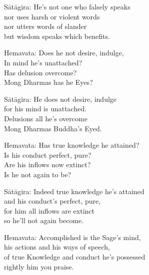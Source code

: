 \begin{MyDescription}{S\=at\=agira:}
He's not one who falsely speaks\\
nor uses harsh or violent words\\
nor utters words of slander\\
but wisdom speaks which benefits.
\end{MyDescription}   

\begin{MyDescription}{Hemavata:}
Does he not desire, indulge,\\
In mind he's unattached?\\
Has delusion overcome?\\
Mong Dharmas has he Eyes?
\end{MyDescription}   

\begin{MyDescription}{S\=at\=agira:}
He does not desire, indulge\\
for his mind is unattached.\\
Delusions all he's overcome\\
Mong Dharmas Buddha's Eyed.
\end{MyDescription}   
   
\begin{MyDescription}{Hemavata:}
Has true knowledge he attained?\\
Is his conduct perfect, pure?\\
Are his inflows now extinct?\\
Is he not again to be?
\end{MyDescription}  

\begin{MyDescription}{S\=at\=agira:}
Indeed true knowledge he's attained\\
and his conduct's perfect, pure,\\
for him all inflows are extinct\\
so he'll not again become.
\end{MyDescription}  

\begin{MyDescription}{Hemavata:}
Accomplished is the Sage's mind,\\
his actions and his ways of speech,\\
of true Knowledge and conduct he's possessed\\
rightly him you praise.
\end{MyDescription}  

